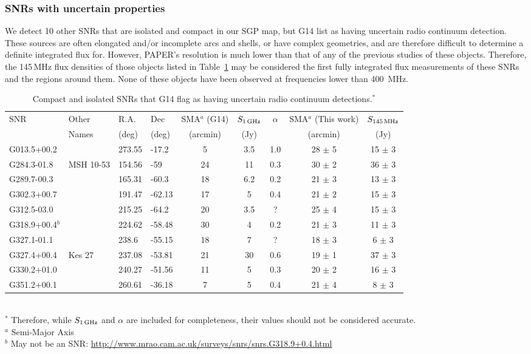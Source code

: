 \documentclass[useAMS,usenatbib]{mn2e}
\begin{document}
\subsubsection{SNRs with uncertain properties}

We detect 10 other SNRs that are isolated and compact in our SGP map, but G14 list as having uncertain radio continuum detection. These sources are often elongated and/or incomplete arcs and shells, or have complex geometries, and are therefore difficult to determine a definite integrated flux for. However, PAPER's resolution is much lower than that of any of the previous studies of these objects. Therefore, the 145\,MHz flux densities of those objects listed in Table~\ref{tab:G14uncertain} may be considered the first fully integrated flux measurements of these SNRs and the regions around them. None of these objects have been observed at frequencies lower than 400\, MHz.

\begin{table}
\caption{Compact and isolated SNRs that G14 flag as having uncertain radio continuum detections.$^*$}
\begin{tabular}{llllccccc}
\hline
SNR	&	Other	&	R.A.	&	Dec	&	SMA$^a$ (G14)	&	$S_{1\,{\rm GHz}}$ &	$\alpha$ 	&	SMA$^a$ (This work)			&	$S_{145\,{\rm MHz}}$			\\
	&	Names	&	(deg)	&	(deg)	&	(arcmin)	&	(Jy)	&		&	(arcmin)			&	(Jy)			\\
\hline			
G013.5+00.2	&		&	273.55	&	-17.2	&	5	&	3.5	&	1.0	&	28	$\pm$	5	&	15	$\pm$	3	\\
G284.3-01.8	&	MSH 10-53	&	154.56	&	-59	&	24	&	11	&	0.3	&	30	$\pm$	2	&	36	$\pm$	3	\\
G289.7-00.3	&		&	165.31	&	-60.3	&	18	&	6.2	&	0.2	&	21	$\pm$	3	&	13	$\pm$	3	\\
G302.3+00.7	&		&	191.47	&	-62.13	&	17	&	5	&	0.4	&	21	$\pm$	2	&	15	$\pm$	3	\\
G312.5-03.0	&		&	215.25	&	-64.2	&	20	&	3.5	&	?	&	25	$\pm$	4	&	15	$\pm$	3	\\
G318.9+00.4$^b$	&		&	224.62	&	-58.48	&	30	&	4	&	0.2	&	21	$\pm$	3	&	11	$\pm$	3	\\
G327.1-01.1	&		&	238.6	&	-55.15	&	18	&	7	&	?	&	18	$\pm$	3	&	6	$\pm$	3	\\
G327.4+00.4	&	Kes 27	&	237.08	&	-53.81	&	21	&	30	&	0.6	&	19	$\pm$	1	&	37	$\pm$	3	\\
G330.2+01.0	&		&	240.27	&	-51.56	&	11	&	5	&	0.3	&	20	$\pm$	2	&	16	$\pm$	3	\\
G351.2+00.1	&		&	260.61	&	-36.18	&	7	&	5	&	0.4	&	21	$\pm$	4	&	8	$\pm$	3	\\
\hline
\end{tabular}
\\
$^*$ Therefore, while $S_{1\,{\rm GHz}}$ and	$\alpha$ are included for completeness, their values should not be considered accurate.\\
$^a$ Semi-Major Axis\\
$^b$ May not be an SNR: \url{http://www.mrao.cam.ac.uk/surveys/snrs/snrs.G318.9+0.4.html}\\
\label{tab:G14uncertain}
\end{table}
\end{document}
